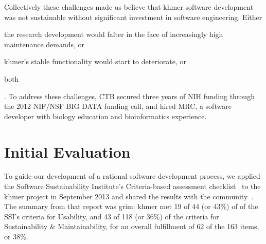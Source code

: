 \documentclass[12pt]{article}
\begin{document}
Collectively these challenges made us believe that khmer software
development was not sustainable without significant investment in
software engineering. Either \begin{inparaenum}[(1)] \item the
  research development would falter in the face of increasingly high
  maintenance demands, or \item khmer's stable functionality would
  start to deteriorate, or \item both\end{inparaenum}.  To address
  these challenges, CTB secured three years of NIH funding through the
  2012 NIF/NSF BIG DATA funding call, and hired MRC, a software developer
  with biology education and bioinformatics experience.







\section{Initial Evaluation}

To guide our development of a rational software development process,
we applied the Software Sustainability Institute's Criteria-based
assessment checklist~\cite{SSI-eval-guide} to the khmer project in
September 2013 and shared the results with the
community~\cite{khmer-assessment}. The summary from that report was grim: khmer
met 19 of 44 (or 43\%) of of the SSI's criteria for Usability, and 43
of 118 (or 36\%) of the criteria for Sustainability \& Maintainability, for an 
overall fulfillment of 62 of the 163 items, or 38\%.
\end{document}
